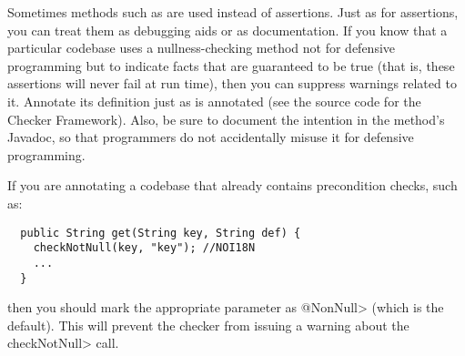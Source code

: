 % 
% 
% 
% 


Sometimes methods such as
 are used
instead of assertions.  Just as for assertions, you can treat them as
debugging aids or as documentation.
If you know that a particular codebase uses
a nullness-checking method not for defensive programming but to indicate
facts that are guaranteed to be true (that is, these assertions will never
fail at run time), then you can suppress
warnings related to it.
Annotate its definition just as
 is annotated (see the
source code for the Checker Framework).
Also, be sure to document the intention in the method's Javadoc, so that
programmers do not
accidentally misuse it for defensive programming.


If you are annotating a codebase that already contains precondition checks,
such as:

\begin{Verbatim}
  public String get(String key, String def) {
    checkNotNull(key, "key"); //NOI18N
    ...
  }
\end{Verbatim}

\noindent
then you should mark the appropriate parameter as \<@NonNull> (which is the
default).  This will prevent the checker from issuing a warning about the
\<checkNotNull> call.



